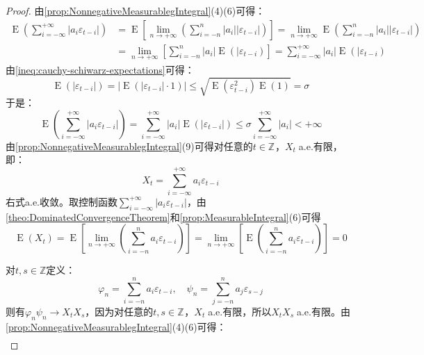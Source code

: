 \begin{proof}
	由\cref{prop:NonnegativeMeasurablegIntegral}(4)(6)可得：
	\begin{align*}
		\operatorname{E}\left(\sum_{i=-\infty}^{+\infty}|a_i\varepsilon_{t-i}|\right)&=\operatorname{E}\left[\lim_{n\to+\infty}\left(\sum_{i=-n}^{n}|a_i||\varepsilon_{t-i}|\right)\right]=\lim_{n\to+\infty}\operatorname{E}\left(\sum_{i=-n}^{n}|a_i||\varepsilon_{t-i}|\right) \\
		&=\lim_{n\to+\infty}\left[\sum_{i=-n}^{n}|a_i|\operatorname{E}(|\varepsilon_{t-i})\right]=\sum_{i=-\infty}^{+\infty}|a_i|\operatorname{E}(|\varepsilon_{t-i})
	\end{align*}
	由\cref{ineq:cauchy-schiwarz-expectations}可得：
	\begin{equation*}
		\operatorname{E}(|\varepsilon_{t-i}|)=\Big|\operatorname{E}(|\varepsilon_{t-i}|\cdot1)\Big|\leqslant\sqrt{\operatorname{E}(\varepsilon_{t-i}^2)\operatorname{E}(1)}=\sigma
	\end{equation*}
	于是：
	\begin{equation*}
		\operatorname{E}\left(\sum_{i=-\infty}^{+\infty}|a_i\varepsilon_{t-i}|\right)=\sum_{i=-\infty}^{+\infty}|a_i|\operatorname{E}(|\varepsilon_{t-i}|)\leqslant\sigma\sum_{i=-\infty}^{+\infty}|a_i|<+\infty
	\end{equation*}
	由\cref{prop:NonnegativeMeasurablegIntegral}(9)可得对任意的$t\in\mathbb{Z}^{}$，$X_t\;$a.e.有限，即：
	\begin{equation*}
		X_t=\sum_{i=-\infty}^{+\infty}a_i\varepsilon_{t-i}
	\end{equation*}
	右式a.e.收敛。取控制函数$\sum\limits_{i=-\infty}^{+\infty}|a_i\varepsilon_{t-i}|$，由\cref{theo:DominatedConvergenceTheorem}和\cref{prop:MeasurableIntegral}(6)可得
	\begin{equation*}
		\operatorname{E}(X_t)=\operatorname{E}\left[\lim_{n\to+\infty}\left(\sum_{i=-n}^{n}a_i\varepsilon_{t-i}\right)\right]=\lim_{n\to+\infty}\left[\operatorname{E}\left(\sum_{i=-n}^{n}a_i\varepsilon_{t-i}\right)\right]=0
	\end{equation*}\par
	对$t,s\in\mathbb{Z}$定义：
	\begin{equation*}
		\varphi_n=\sum_{i=-n}^{n}a_i\varepsilon_{t-i},\quad\psi_n=\sum_{j=-n}^{n}a_j\varepsilon_{s-j}
	\end{equation*}
	则有$\varphi_n\psi_n\to X_tX_s$，因为对任意的$t,s\in\mathbb{Z}^{}$，$X_t\;$a.e.有限，所以$X_tX_s\;$a.e.有限。由\cref{prop:NonnegativeMeasurablegIntegral}(4)(6)可得：
	\begin{align*}

\end{align*}
\end{proof}
